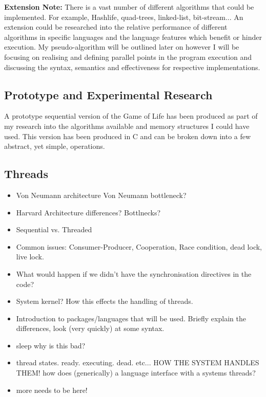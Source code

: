 \documentclass[11pt]{article} %
\begin{document}
\begin{mdframed}
{\bf Extension Note:} There is a vast number of different algorithms that could be implemented. For example, Hashlife, quad-trees, linked-list, bit-stream... An extension could be researched into the relative performance of different algorithms in specific languages and the language features which benefit or hinder execution. My pseudo-algorithm will be outlined later on however I will be focusing on realising and defining parallel points in the program execution and discussing the syntax, semantics and effectiveness for respective implementations. 
\end{mdframed} 
\subsection{Prototype and Experimental Research}

A prototype sequential version of the Game of Life has been produced as part of my research into the algorithms available and memory structures I could have used. This version has been produced in C and can be broken down into a few abstract, yet simple, operations.

\subsection{Threads}
\begin{itemize}
\item Von Neumann architecture
\subitem Von Neumann bottleneck?
\item Harvard Architecture
\subitem differences? Bottlnecks?
\item Sequential vs. Threaded
\item Common issues: Consumer-Producer, Cooperation, Race condition, dead lock, live lock.
\item What would happen if we didn't have the synchronisation directives in the code?
\item System kernel? How this effects the handling of threads.
\item Introduction to packages/languages that will be used.
\subitem Briefly explain the differences, look (very quickly) at some syntax.
\item sleep why is this bad?
\item thread states. ready. executing. dead. etc... HOW THE SYSTEM HANDLES THEM!
\subitem how does (generically) a language interface with a systems threads?
\item more needs to be here!
\end{itemize}
\end{document}
